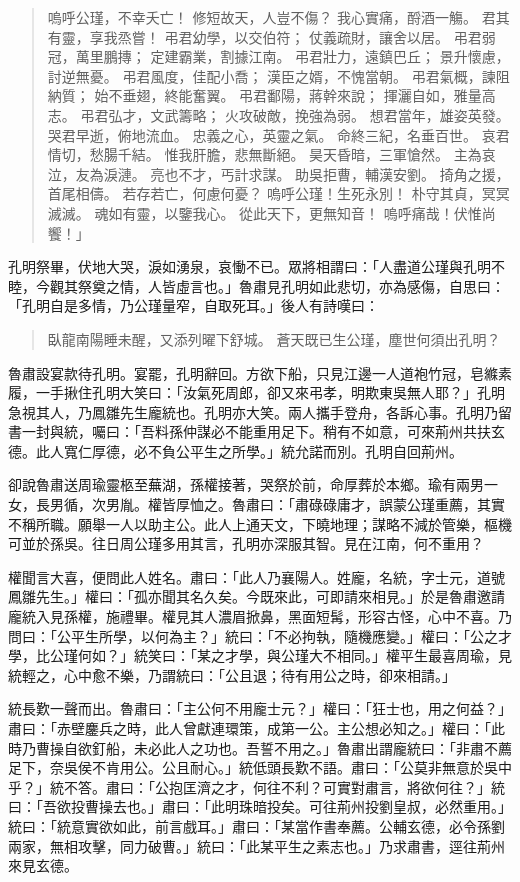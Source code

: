 \begin{quote}
嗚呼公瑾，不幸夭亡！
修短故天，人豈不傷？
我心實痛，酹酒一觴。
君其有靈，享我烝嘗！
弔君幼學，以交伯符；
仗義疏財，讓舍以居。
弔君弱冠，萬里鵬摶；
定建霸業，割據江南。
弔君壯力，遠鎮巴丘；
景升懷慮，討逆無憂。
弔君風度，佳配小喬；
漢臣之婿，不愧當朝。
弔君氣概，諫阻納質；
始不垂翅，終能奮翼。
弔君鄱陽，蔣幹來說；
揮灑自如，雅量高志。
弔君弘才，文武籌略；
火攻破敵，挽強為弱。
想君當年，雄姿英發。
哭君早逝，俯地流血。
忠義之心，英靈之氣。
命終三紀，名垂百世。
哀君情切，愁腸千結。
惟我肝膽，悲無斷絕。
昊天昏暗，三軍愴然。
主為哀泣，友為淚漣。
亮也不才，丐計求謀。
助吳拒曹，輔漢安劉。
掎角之援，首尾相儔。
若存若亡，何慮何憂？
嗚呼公瑾！生死永別！
朴守其貞，冥冥滅滅。
魂如有靈，以鑒我心。
從此天下，更無知音！
嗚呼痛哉！伏惟尚饗！」
\end{quote}

孔明祭畢，伏地大哭，淚如湧泉，哀慟不已。眾將相謂曰：「人盡道公瑾與孔明不睦，今觀其祭奠之情，人皆虛言也。」魯肅見孔明如此悲切，亦為感傷，自思曰：「孔明自是多情，乃公瑾量窄，自取死耳。」後人有詩嘆曰：

\begin{quote}
臥龍南陽睡未醒，又添列曜下舒城。
蒼天既已生公瑾，塵世何須出孔明？
\end{quote}

魯肅設宴款待孔明。宴罷，孔明辭回。方欲下船，只見江邊一人道袍竹冠，皂縧素履，一手揪住孔明大笑曰：「汝氣死周郎，卻又來弔孝，明欺東吳無人耶？」孔明急視其人，乃鳳雛先生龐統也。孔明亦大笑。兩人攜手登舟，各訴心事。孔明乃留書一封與統，囑曰：「吾料孫仲謀必不能重用足下。稍有不如意，可來荊州共扶玄德。此人寬仁厚德，必不負公平生之所學。」統允諾而別。孔明自回荊州。

卻說魯肅送周瑜靈柩至蕪湖，孫權接著，哭祭於前，命厚葬於本鄉。瑜有兩男一女，長男循，次男胤。權皆厚恤之。魯肅曰：「肅碌碌庸才，誤蒙公瑾重薦，其實不稱所職。願舉一人以助主公。此人上通天文，下曉地理；謀略不減於管樂，樞機可並於孫吳。往日周公瑾多用其言，孔明亦深服其智。見在江南，何不重用？

權聞言大喜，便問此人姓名。肅曰：「此人乃襄陽人。姓龐，名統，字士元，道號鳳雛先生。」權曰：「孤亦聞其名久矣。今既來此，可即請來相見。」於是魯肅邀請龐統入見孫權，施禮畢。權見其人濃眉掀鼻，黑面短髯，形容古怪，心中不喜。乃問曰：「公平生所學，以何為主？」統曰：「不必拘執，隨機應變。」權曰：「公之才學，比公瑾何如？」統笑曰：「某之才學，與公瑾大不相同。」權平生最喜周瑜，見統輕之，心中愈不樂，乃謂統曰：「公且退；待有用公之時，卻來相請。」

統長歎一聲而出。魯肅曰：「主公何不用龐士元？」權曰：「狂士也，用之何益？」肅曰：「赤壁鏖兵之時，此人曾獻連環策，成第一公。主公想必知之。」權曰：「此時乃曹操自欲釘船，未必此人之功也。吾誓不用之。」魯肅出謂龐統曰：「非肅不薦足下，奈吳侯不肯用公。公且耐心。」統低頭長歎不語。肅曰：「公莫非無意於吳中乎？」統不答。肅曰：「公抱匡濟之才，何往不利？可實對肅言，將欲何往？」統曰：「吾欲投曹操去也。」肅曰：「此明珠暗投矣。可往荊州投劉皇叔，必然重用。」統曰：「統意實欲如此，前言戲耳。」肅曰：「某當作書奉薦。公輔玄德，必令孫劉兩家，無相攻擊，同力破曹。」統曰：「此某平生之素志也。」乃求肅書，逕往荊州來見玄德。

